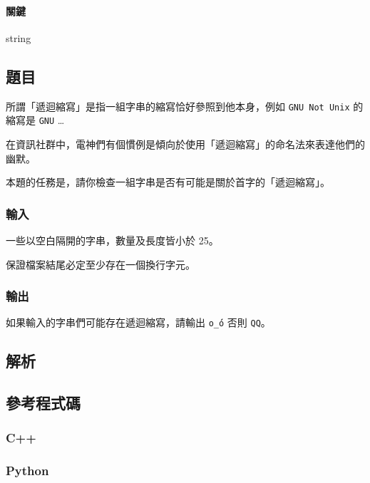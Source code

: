 \documentclass[a4paper,10pt]{article}
\begin{document}
\paragraph{關鍵} string

\subsection{題目}

所謂「遞迴縮寫」是指一組字串的縮寫恰好參照到他本身，例如 \texttt{GNU Not Unix} 的縮寫是 \texttt{GNU} \dots

在資訊社群中，電神們有個慣例是傾向於使用「遞迴縮寫」的命名法來表達他們的幽默。

本題的任務是，請你檢查一組字串是否有可能是關於首字的「遞迴縮寫」。

\subsubsection{輸入}

一些以空白隔開的字串，數量及長度皆小於 25。

保證檔案結尾必定至少存在一個換行字元。

\subsubsection{輸出}

如果輸入的字串們可能存在遞迴縮寫，請輸出 \texttt{o\'\_\'o} 否則 \texttt{QQ}。

\subsection{解析}

\subsection{參考程式碼}

\subsubsection{C++}



\subsubsection{Python}
\end{document}
